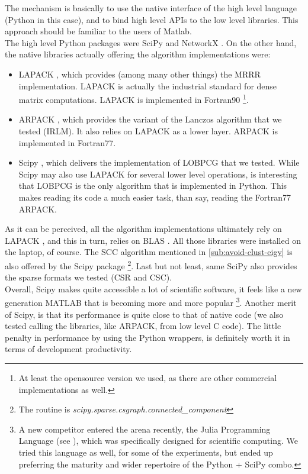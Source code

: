 The mechanism is basically to use the native interface of the high
level language (Python in this case), and to bind high level APIs to
the low level libraries. This approach should be familiar to the users
of Matlab. \\

The high level Python packages were SciPy \cite{scipy} and NetworkX
\cite{networkx}. On the other hand, the 
native libraries actually offering the algorithm implementations were:

\begin{itemize}
  \item LAPACK \cite{lapack}, which provides (among many other things)
    the \gls{MRRR} implementation. LAPACK is actually the industrial
    standard for dense matrix computations. LAPACK is implemented in
    Fortran90 \footnote{At least the opensource version we used, as
      there are other commercial implementations as well.}.

  \item ARPACK \cite{arpack}, which provides the variant of the
    Lanczos algorithm that we tested (\gls{IRLM}). It also relies on LAPACK
    as a lower layer. ARPACK is implemented in Fortran77.

  \item Scipy \cite{scipy}, which delivers the implementation of
    \gls{LOBPCG} that we tested. While Scipy may also use LAPACK for several
    lower level operations, is interesting that \gls{LOBPCG} is the only
    algorithm that is implemented in Python. This makes reading its
    code a much easier task, than say, reading the Fortran77 ARPACK. 
\end{itemize}

As it can be perceived, all the algorithm implementations ultimately
rely on LAPACK \cite{lapack}, and this in turn, relies on BLAS \cite{blas}. All
those libraries were installed on the laptop, of course. The
\gls{SCC} algorithm mentioned in \cref{sub:avoid-clust-eigv} is
also offered by the Scipy package 
\footnote{The routine is
  \emph{scipy.sparse.csgraph.connected\_component}}. Last but not 
least, same SciPy also provides the sparse formats we tested (CSR and CSC). \\

Overall, Scipy makes quite accessible a lot of scientific
software, it feels like a new generation MATLAB that is becoming more
and more popular \footnote{A new competitor entered the arena
  recently, the Julia Programming Language (see \cite{julia}), which
  was specifically
  designed for scientific computing. We tried this language as well,
  for some of the experiments, but ended up preferring the maturity
  and wider repertoire of the Python + SciPy combo.}. Another merit of Scipy,
is that its performance is quite close to that of native code (we
also tested calling the libraries, like ARPACK, from low level C
code). The little penalty in performance by using the Python wrappers,
is definitely worth it in terms of development productivity. 

